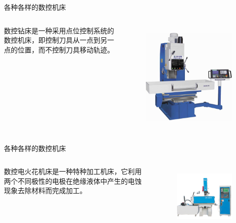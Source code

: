\documentclass[UTF8,zihao=-4]{ctexbeamer}
\begin{document}
\begin{frame}{各种各样的数控机床}
\begin{columns}
数控钻床是一种采用点位控制系统的数控机床，即控制刀具从一点到另一点的位置，而不控制刀具移动轨迹。
	
	\begin{figure}
		\centering
		\includegraphics[width= 0.8\linewidth]{image/1-4}
		\label{fig:1-4}
	\end{figure}
\end{columns}
\end{frame}

\begin{frame}{各种各样的数控机床}
\begin{columns}
	数控电火花机床是一种特种加工机床，它利用两个不同极性的电极在绝缘液体中产生的电蚀现象去除材料而完成加工。
	
	\begin{figure}
		\centering
		\includegraphics[width= 0.8\linewidth]{image/1-5}
		\label{fig:1-5}
	\end{figure}
\end{columns}
\end{frame}
\end{document}
